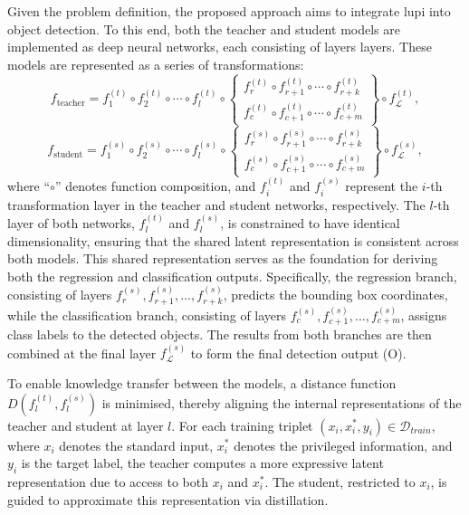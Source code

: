 Given the problem definition, the proposed approach aims to integrate \gls{lupi} into object detection. To this end, both the \gls{teacher} and \gls{student} models are implemented as deep neural networks, each consisting of \gls{layers} layers. These models are represented as a series of transformations:
\begin{equation}
f_{\text{teacher}} = f_1^{(t)} \circ f_2^{(t)} \circ \cdots \circ f_{l}^{(t)} \circ 
\left\{
  \begin{array}{l}
    f_r^{(t)} \circ f_{r+1}^{(t)} \circ \cdots \circ f_{r+k}^{(t)} \\
    f_c^{(t)} \circ f_{c+1}^{(t)} \circ \cdots \circ f_{c+m}^{(t)}
  \end{array}
\right\} \circ f_\mathcal{L}^{(t)},
\end{equation}
\begin{equation}
f_{\text{student}} = f_1^{(s)} \circ f_2^{(s)} \circ \cdots \circ f_{l}^{(s)} \circ 
\left\{
  \begin{array}{l}
    f_r^{(s)} \circ f_{r+1}^{(s)} \circ \cdots \circ f_{r+k}^{(s)} \\
    f_c^{(s)} \circ f_{c+1}^{(s)} \circ \cdots \circ f_{c+m}^{(s)}
  \end{array}
\right\} \circ f_\mathcal{L}^{(s)},
\end{equation}
where ``\( \circ \)'' denotes function composition, and \( f_i^{(t)} \) and \( f_i^{(s)} \) represent the \( i \)-th transformation layer in the teacher and student networks, respectively. The \( l \)-th layer of both networks, \( f_l^{(t)} \) and \( f_l^{(s)} \), is constrained to have identical dimensionality, ensuring that the shared latent representation is consistent across both models. This shared representation serves as the foundation for deriving both the regression and classification outputs. Specifically, the regression branch, consisting of layers \( f_r^{(s)}, f_{r+1}^{(s)}, \dots, f_{r+k}^{(s)} \), predicts the bounding box coordinates, while the classification branch, consisting of layers \( f_c^{(s)}, f_{c+1}^{(s)}, \dots, f_{c+m}^{(s)} \), assigns class labels to the detected objects. The results from both branches are then combined at the final layer \( f_\mathcal{L}^{(s)} \) to form the final detection output (\gls{O}).

To enable knowledge transfer between the models, a distance function \( D(f_l^{(t)}, f_l^{(s)}) \) is minimised, thereby aligning the internal representations of the teacher and student at layer \( l \). For each training triplet \( (x_i, x_i^*, y_i) \in \mathcal{D}_{train} \), where \( x_i \) denotes the standard input, \( x_i^* \) denotes the privileged information, and \( y_i \) is the target label, the teacher computes a more expressive latent representation due to access to both \( x_i \) and \( x_i^* \). The student, restricted to \( x_i \), is guided to approximate this representation via distillation.

